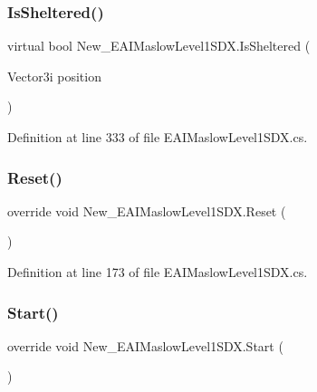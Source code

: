 \mbox{\label{class_new___e_a_i_maslow_level1_s_d_x_af5aa7fc6aab1b4a97cb4538893657c7b}} 
\subsubsection{\texorpdfstring{IsSheltered()}{IsSheltered()}}
{\footnotesize\ttfamily virtual bool New\+\_\+\+E\+A\+I\+Maslow\+Level1\+S\+D\+X.\+Is\+Sheltered (\begin{DoxyParamCaption}\item[{Vector3i}]{position }\end{DoxyParamCaption})\hspace{0.3cm}{\ttfamily [virtual]}}



Definition at line 333 of file E\+A\+I\+Maslow\+Level1\+S\+D\+X.\+cs.

\mbox{\label{class_new___e_a_i_maslow_level1_s_d_x_a0a2a1853f09db9e46ed338f37634c963}} 
\subsubsection{\texorpdfstring{Reset()}{Reset()}}
{\footnotesize\ttfamily override void New\+\_\+\+E\+A\+I\+Maslow\+Level1\+S\+D\+X.\+Reset (\begin{DoxyParamCaption}{ }\end{DoxyParamCaption})}



Definition at line 173 of file E\+A\+I\+Maslow\+Level1\+S\+D\+X.\+cs.

\mbox{\label{class_new___e_a_i_maslow_level1_s_d_x_a6a329f69e8b16b28d143261f34bb4290}} 
\subsubsection{\texorpdfstring{Start()}{Start()}}
{\footnotesize\ttfamily override void New\+\_\+\+E\+A\+I\+Maslow\+Level1\+S\+D\+X.\+Start (\begin{DoxyParamCaption}{ }\end{DoxyParamCaption})}



